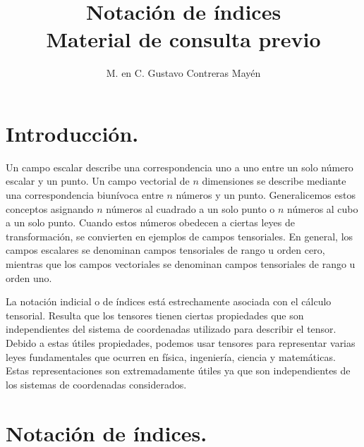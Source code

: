 \documentclass[hidelinks,12pt]{article}
\title{Notación de índices \\ \large{Material de consulta previo}\vspace{-3ex}}
\author{M. en C. Gustavo Contreras Mayén}
\date{ }
\begin{document}
\vspace{-4cm}
\maketitle
\fontsize{14}{14}\selectfont
\tableofcontents
\newpage


\section*{Introducción.}

Un campo escalar describe una correspondencia uno a uno entre un solo número escalar y un punto. Un campo vectorial de $n$ dimensiones se describe mediante una correspondencia biunívoca entre $n$ números y un punto. Generalicemos estos conceptos asignando $n$ números al cuadrado a un solo punto o $n$ números al cubo a un solo punto. Cuando estos números obedecen a ciertas leyes de transformación, se convierten en ejemplos de campos tensoriales. En general, los campos escalares se denominan campos tensoriales de rango u orden cero, mientras que los campos vectoriales se denominan campos tensoriales de rango u orden uno.
\par
La notación indicial o de índices está estrechamente asociada con el cálculo tensorial. Resulta que los tensores tienen ciertas propiedades que son independientes del sistema de coordenadas utilizado para describir el tensor. Debido a estas útiles propiedades, podemos usar tensores para representar varias leyes fundamentales que ocurren en física, ingeniería, ciencia y matemáticas. Estas representaciones son extremadamente útiles ya que son independientes de los sistemas de coordenadas considerados.

\section{Notación de índices.}
\end{document}

